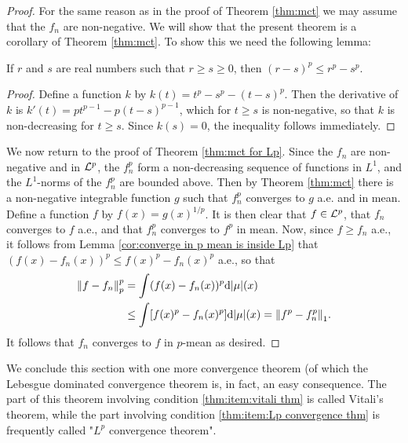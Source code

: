 \begin{proof}
For the same reason as in the proof of Theorem \ref{thm:mct} we may assume that the $f_n$ are non-negative. We will show that the present theorem is a corollary of Theorem \ref{thm:mct}. To show this we need the following lemma:

\begin{lemma}
If $r$ and $s$ are real numbers such that $r\geq s\geq 0$, then $(r-s)^p\leq r^p-s^p$.
\end{lemma}

\begin{proof}
Define a function $k$ by $k(t)=t^p-s^p-(t-s)^p$. Then the derivative of $k$ is $k'(t)=pt^{p-1}-p(t-s)^{p-1}$, which for $t\geq s$ is non-negative, so that $k$ is non-decreasing for $t\geq s$. Since $k(s)=0$, the inequality follows immediately.
\end{proof}

We now return to the proof of Theorem \ref{thm:mct for Lp}. Since the $f_n$ are non-negative and in ${\cal L}^p$, the $f_n^p$ form a non-decreasing sequence of functions in $L^1$, and the $L^1$-norms of the $f_n^p$ are bounded above. Then by Theorem \ref{thm:mct} there is a non-negative integrable function $g$ such that $f_n^p$ converges to $g$ a.e. and in mean. Define a function $f$ by $f(x)=g(x)^{1/p}$. It is then clear that $f\in{\cal L}^p$, that $f_n$ converges to $f$ a.e., and that $f_n^p$ converges to $f^p$ in mean. Now, since $f \geq f_n$ a.e., it follows from Lemma \ref{cor:converge in p mean is inside Lp} that $(f(x)-f_n(x))^p\leq f(x)^p-f_n(x)^p$ a.e., so that
\begin{align*}
    \norm{f-f_n}_p^p&=\int(f(x)-f_n(x))^p\dd|\mu|(x) \\
    &\leq\int[f(x)^p-f_n(x)^p]\dd|\mu|(x)=\norm{f^p-f_n^p}_1.
\end{align*}
It follows that $f_n$ converges to $f$ in $p$-mean as desired.
\end{proof}

We conclude this section with one more convergence theorem (of which the Lebesgue dominated convergence theorem is, in fact, an easy consequence. The part of this theorem involving condition \ref{thm:item:vitali thm} is called Vitali's theorem, while the part involving condition \ref{thm:item:Lp convergence thm} is frequently called "$L^p$ convergence theorem".


